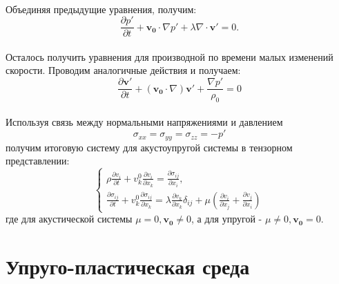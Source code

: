 \documentclass[12pt,a4paper, titlepage, openany]{book}
\begin{document}
\\
Объединяя предыдущие уравнения, получим:
\begin{equation}
\frac{\partial p '}{\partial t} + \mathbf{v_0} \cdot \nabla p' + \lambda \nabla \cdot \mathbf{v'} = 0.
\end{equation}
\\
Осталось получить уравнения для производной по времени малых изменений скорости. Проводим аналогичные действия и получаем:
\begin{equation}
\frac{\partial \mathbf{v'}}{\partial t} + (\mathbf{v_0} \cdot \nabla) \mathbf{v'} + \frac{\nabla p'}{\rho_0} = 0
\end{equation}
\\
Используя связь между нормальными напряжениями и давлением 
\begin{equation}
\sigma_{xx} = \sigma_{yy} = \sigma_{zz} = -p'
\end{equation}
получим итоговую систему для акустоупругой системы в тензорном представлении:
\begin{equation}
\begin{cases}
\rho \frac{\partial v_i}{\partial t} + v^0_k \frac{\partial v_i}{\partial x_k} = \frac{\partial \sigma_{ij}}{\partial x_i}, \\
\frac{\partial \sigma_{ij}}{\partial t} + v^0_k \frac{\partial \sigma_{ij}}{\partial x_k} = \lambda \frac{\partial  v_k}{\partial x_k} \delta_{ij} + \mu (\frac{\partial v_i}{\partial x_j} + \frac{\partial v_j}{\partial x_i})
\end{cases}
\end{equation}
где для акустической системы  $\mu = 0, \mathbf{v_0} \neq 0$, а для упругой - $\mu \neq 0, \mathbf{v_0} =  0$.

\section*{Упруго-пластическая среда}
\end{document}
